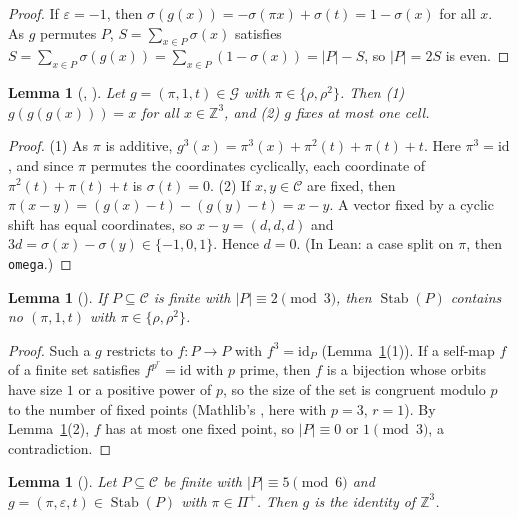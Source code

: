 \documentclass[11pt]{amsart}
\theoremstyle{plain}
\newtheorem{lemma}[theorem]{Lemma}
\theoremstyle{definition}
\newcommand{\Z}{\mathbb{Z}}
\newcommand{\C}{\mathcal{C}}
\newcommand{\G}{\mathcal{G}}
\newcommand{\Stab}{\operatorname{Stab}}
\begin{document}
\begin{proof}
If $\varepsilon=-1$, then $\sigma(g(x))=-\sigma(\pi x)+\sigma(t)=1-\sigma(x)$ for all $x$. As $g$ permutes $P$, $S=\sum_{x\in P}\sigma(x)$ satisfies $S=\sum_{x\in P}\sigma(g(x))=\sum_{x\in P}(1-\sigma(x))=|P|-S$, so $|P|=2S$ is even.
\end{proof}

\begin{lemma}[, ]\label{lem:rot3}
Let $g=(\pi,1,t)\in\G$ with $\pi\in\{\rho,\rho^2\}$. Then (1) $g(g(g(x)))=x$ for all $x\in\Z^3$, and (2) $g$ fixes at most one cell.
\end{lemma}

\begin{proof}
(1) As $\pi$ is additive, $g^3(x)=\pi^3(x)+\pi^2(t)+\pi(t)+t$. Here $\pi^3=\mathrm{id}$, and since $\pi$ permutes the coordinates cyclically, each coordinate of $\pi^2(t)+\pi(t)+t$ is $\sigma(t)=0$.
(2) If $x,y\in\C$ are fixed, then $\pi(x-y)=(g(x)-t)-(g(y)-t)=x-y$. A vector fixed by a cyclic shift has equal coordinates, so $x-y=(d,d,d)$ and $3d=\sigma(x)-\sigma(y)\in\{-1,0,1\}$. Hence $d=0$. (In Lean: a case split on $\pi$, then \texttt{omega}.)
\end{proof}

\begin{lemma}[]\label{lem:norot3}
If $P\subseteq\C$ is finite with $|P|\equiv2\pmod3$, then $\Stab(P)$ contains no $(\pi,1,t)$ with $\pi\in\{\rho,\rho^2\}$.
\end{lemma}

\begin{proof}
Such a $g$ restricts to $f\colon P\to P$ with $f^3=\mathrm{id}_P$ (Lemma~\ref{lem:rot3}(1)). If a self-map $f$ of a finite set satisfies $f^{p^r}=\mathrm{id}$ with $p$ prime, then $f$ is a bijection whose orbits have size $1$ or a positive power of $p$, so the size of the set is congruent modulo $p$ to the number of fixed points (Mathlib's , here with $p=3$, $r=1$). By Lemma~\ref{lem:rot3}(2), $f$ has at most one fixed point, so $|P|\equiv0$ or $1\pmod3$, a contradiction.
\end{proof}

\begin{lemma}[]\label{lem:rot}
Let $P\subseteq\C$ be finite with $|P|\equiv5\pmod 6$ and $g=(\pi,\varepsilon,t)\in\Stab(P)$ with $\pi\in\Pi^+$. Then $g$ is the identity of $\Z^3$.
\end{lemma}
\end{document}
